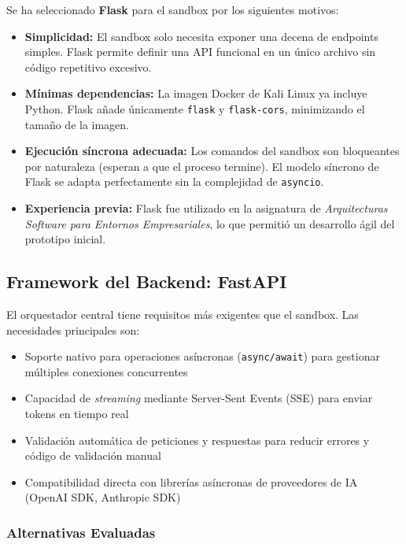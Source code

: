 Se ha seleccionado \textbf{Flask} para el sandbox por los siguientes motivos:

\begin{itemize}
    \item \textbf{Simplicidad:} El sandbox solo necesita exponer una decena de endpoints simples. Flask permite definir una API funcional en un único archivo sin código repetitivo excesivo.
    \item \textbf{Mínimas dependencias:} La imagen Docker de Kali Linux ya incluye Python. Flask añade únicamente \texttt{flask} y \texttt{flask-cors}, minimizando el tamaño de la imagen.
    \item \textbf{Ejecución síncrona adecuada:} Los comandos del sandbox son bloqueantes por naturaleza (esperan a que el proceso termine). El modelo síncrono de Flask se adapta perfectamente sin la complejidad de \texttt{asyncio}.
    \item \textbf{Experiencia previa:} Flask fue utilizado en la asignatura de \textit{Arquitecturas Software para Entornos Empresariales}, lo que permitió un desarrollo ágil del prototipo inicial.
\end{itemize}

\subsection{Framework del Backend: FastAPI}

El orquestador central tiene requisitos más exigentes que el sandbox. Las necesidades principales son:

\begin{itemize}
    \item Soporte nativo para operaciones asíncronas (\texttt{async/await}) para gestionar múltiples conexiones concurrentes
    \item Capacidad de \textit{streaming} mediante Server-Sent Events (SSE) para enviar tokens en tiempo real
    \item Validación automática de peticiones y respuestas para reducir errores y código de validación manual
    \item Compatibilidad directa con librerías asíncronas de proveedores de IA (OpenAI SDK, Anthropic SDK)
\end{itemize}

\subsubsection{Alternativas Evaluadas}


